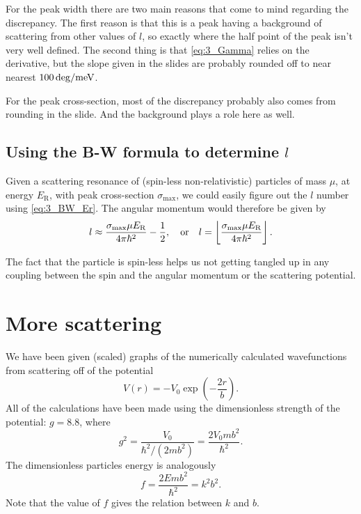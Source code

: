 \documentclass[11pt,letter, swedish, english
]{article}
\begin{document}
For the
peak width there are two main reasons that come to mind regarding the
discrepancy. The first reason is that this is a peak having a
background of scattering from other values of $l$, so exactly where
the half point of the peak isn't very well defined. The second thing
is that \eqref{eq:3_Gamma} relies on the derivative, but the slope
given in the slides are probably rounded off to near nearest
$\unit[100]{deg/meV}$. 

For the peak cross-section, most of the discrepancy probably also
comes from rounding in the slide. And the background plays a role here
as well. 

\subsection{Using the B-W formula to determine $l$}
\newcommand{\ER}{E_{\text{R}}}
Given a scattering resonance of (spin-less non-relativistic) particles
of mass $\mu$, at energy $\ER$, with peak cross-section $\sigma_{\max}$, we could
easily figure out the $l$ number using \eqref{eq:3_BW_Er}. The angular
momentum would therefore be given by
\begin{equation}
l\approx\frac{\sigma_{\max} \mu \ER}{4\pi\hbar^2} - \frac{1}{2}
\qcomma\text{or}\quad
l=\left\lfloor\frac{\sigma_{\max} \mu \ER}{4\pi\hbar^2}\right\rfloor.
\end{equation}

The fact that the particle is spin-less helps us not getting tangled
up in any coupling between the spin and the angular momentum or the
scattering potential.






\section{More scattering}
We have been given (scaled) graphs of the numerically calculated
wavefunctions from scattering off of the potential
\begin{equation}
V(r)=-V_0\exp(-\frac{2r}{b}).
\end{equation}
All of the calculations have been made using the dimensionless
strength of the potential: $g=8.8$, where
\begin{equation}
g^2=\frac{V_0}{\hbar^2/(2mb^2)}
=\frac{2V_0 mb^2}{\hbar^2}.
\end{equation}
The dimensionless particles energy is analogously 
\begin{equation}
f=\frac{2Emb^2}{\hbar^2}=k^2b^2.
\end{equation}
Note that the value of $f$ gives the relation between $k$ and $b$.
\end{document}
